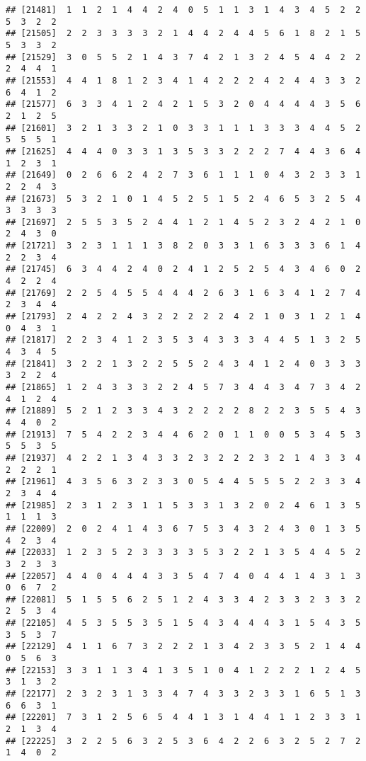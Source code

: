 \documentclass[
]{article}
\begin{document}
\begin{verbatim}
## [21481]  1  1  2  1  4  4  2  4  0  5  1  1  3  1  4  3  4  5  2  2  5  3  2  2
## [21505]  2  2  3  3  3  3  2  1  4  4  2  4  4  5  6  1  8  2  1  5  5  3  3  2
## [21529]  3  0  5  5  2  1  4  3  7  4  2  1  3  2  4  5  4  4  2  2  2  4  4  1
## [21553]  4  4  1  8  1  2  3  4  1  4  2  2  2  4  2  4  4  3  3  2  6  4  1  2
## [21577]  6  3  3  4  1  2  4  2  1  5  3  2  0  4  4  4  4  3  5  6  2  1  2  5
## [21601]  3  2  1  3  3  2  1  0  3  3  1  1  1  3  3  3  4  4  5  2  5  5  5  1
## [21625]  4  4  4  0  3  3  1  3  5  3  3  2  2  2  7  4  4  3  6  4  1  2  3  1
## [21649]  0  2  6  6  2  4  2  7  3  6  1  1  1  0  4  3  2  3  3  1  2  2  4  3
## [21673]  5  3  2  1  0  1  4  5  2  5  1  5  2  4  6  5  3  2  5  4  3  3  3  3
## [21697]  2  5  5  3  5  2  4  4  1  2  1  4  5  2  3  2  4  2  1  0  2  4  3  0
## [21721]  3  2  3  1  1  1  3  8  2  0  3  3  1  6  3  3  3  6  1  4  2  2  3  4
## [21745]  6  3  4  4  2  4  0  2  4  1  2  5  2  5  4  3  4  6  0  2  4  2  2  4
## [21769]  2  2  5  4  5  5  4  4  4  2  6  3  1  6  3  4  1  2  7  4  2  3  4  4
## [21793]  2  4  2  2  4  3  2  2  2  2  2  4  2  1  0  3  1  2  1  4  0  4  3  1
## [21817]  2  2  3  4  1  2  3  5  3  4  3  3  3  4  4  5  1  3  2  5  4  3  4  5
## [21841]  3  2  2  1  3  2  2  5  5  2  4  3  4  1  2  4  0  3  3  3  3  2  2  4
## [21865]  1  2  4  3  3  3  2  2  4  5  7  3  4  4  3  4  7  3  4  2  4  1  2  4
## [21889]  5  2  1  2  3  3  4  3  2  2  2  2  8  2  2  3  5  5  4  3  4  4  0  2
## [21913]  7  5  4  2  2  3  4  4  6  2  0  1  1  0  0  5  3  4  5  3  5  5  3  5
## [21937]  4  2  2  1  3  4  3  3  2  3  2  2  2  3  2  1  4  3  3  4  2  2  2  1
## [21961]  4  3  5  6  3  2  3  3  0  5  4  4  5  5  5  2  2  3  3  4  2  3  4  4
## [21985]  2  3  1  2  3  1  1  5  3  3  1  3  2  0  2  4  6  1  3  5  1  1  1  3
## [22009]  2  0  2  4  1  4  3  6  7  5  3  4  3  2  4  3  0  1  3  5  4  2  3  4
## [22033]  1  2  3  5  2  3  3  3  3  5  3  2  2  1  3  5  4  4  5  2  3  2  3  3
## [22057]  4  4  0  4  4  4  3  3  5  4  7  4  0  4  4  1  4  3  1  3  0  6  7  2
## [22081]  5  1  5  5  6  2  5  1  2  4  3  3  4  2  3  3  2  3  3  2  2  5  3  4
## [22105]  4  5  3  5  5  3  5  1  5  4  3  4  4  4  3  1  5  4  3  5  3  5  3  7
## [22129]  4  1  1  6  7  3  2  2  2  1  3  4  2  3  3  5  2  1  4  4  0  5  6  3
## [22153]  3  3  1  1  3  4  1  3  5  1  0  4  1  2  2  2  1  2  4  5  3  1  3  2
## [22177]  2  3  2  3  1  3  3  4  7  4  3  3  2  3  3  1  6  5  1  3  6  6  3  1
## [22201]  7  3  1  2  5  6  5  4  4  1  3  1  4  4  1  1  2  3  3  1  2  1  3  4
## [22225]  3  2  2  5  6  3  2  5  3  6  4  2  2  6  3  2  5  2  7  2  1  4  0  2

\end{verbatim}
\end{document}
